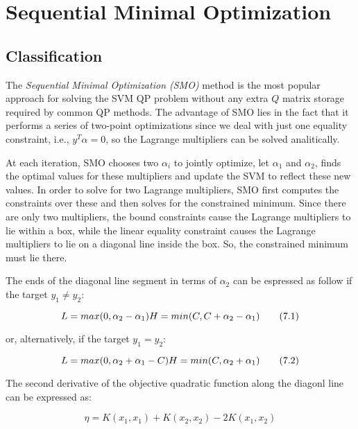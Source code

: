 \section{Sequential Minimal Optimization}

\subsection{Classification}

The \emph{Sequential Minimal Optimization (SMO)} \cite{platt1998sequential} method is the most popular approach for solving the SVM QP problem without any extra $Q$ matrix storage required by common QP methods. The advantage of SMO lies in the fact that it performs a series of two-point optimizations since we deal with just one equality constraint, i.e., $y^T \alpha=0$, so the Lagrange multipliers can be solved analitically.

At each iteration, SMO chooses two $\alpha_i$ to jointly optimize, let $\alpha_1$ and $\alpha_2$, finds the optimal values for these multipliers and update the SVM to reflect these new values. In order to solve for two Lagrange multipliers, SMO first computes the constraints over these and then solves for the constrained minimum. Since there are only two multipliers, the bound constraints cause the Lagrange multipliers to lie within a box, while the linear equality constraint causes the Lagrange multipliers to lie on a diagonal line inside the box. So, the constrained minimum must lie there.

The ends of the diagonal line segment in terms of $\alpha_2$ can be espressed as follow if the target $y_1 \ne y_2$:

\begin{equation}
L = max(0, \alpha_2 - \alpha_1) \\
H = min(C, C + \alpha_2 - \alpha_1) \tag{7.1}
\end{equation}

or, alternatively, if the target $y_1 = y_2$:

\begin{equation}
L = max(0, \alpha_2 + \alpha_1 - C) \\
H = min(C, \alpha_2 + \alpha_1) \tag{7.2}
\end{equation}

The second derivative of the objective quadratic function along the diagonl line can be expressed as:

\begin{equation}
\eta = K(x_1, x_1) + K(x_2, x_2) - 2K(x_1, x_2) \tag{7.3}
\end{equation}

